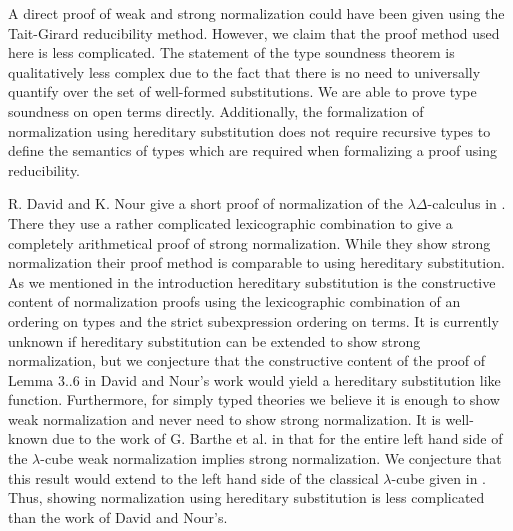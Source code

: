 A direct proof of weak and strong normalization could have been given
using the Tait-Girard reducibility method.  However, we claim that the
proof method used here is less complicated.  The statement of the type
soundness theorem is qualitatively less complex due to the fact that
there is no need to universally quantify over the set of well-formed
substitutions.  We are able to prove type soundness on open terms
directly.  Additionally, the formalization of normalization using
hereditary substitution does not require recursive types to define the
semantics of types which are required when formalizing a proof using
reducibility.  

R. David and K. Nour give a short proof of normalization of the
$\lambda\Delta$-calculus in \cite{David:2003}.  There they use a
rather complicated lexicographic combination to give a completely
arithmetical proof of strong normalization.  While they show strong
normalization their proof method is comparable to using hereditary
substitution.  As we mentioned in the introduction hereditary
substitution is the constructive content of normalization proofs using
the lexicographic combination of an ordering on types and the strict
subexpression ordering on terms.  It is currently unknown if
hereditary substitution can be extended to show strong normalization,
but we conjecture that the constructive content of the proof of Lemma
3..6 in David and Nour's work would yield a hereditary substitution
like function.  Furthermore, for simply typed theories we believe it
is enough to show weak normalization and never need to show strong
normalization.  It is well-known due to the work of G. Barthe et
al. in \cite{Barthe:2001} that for the entire left hand side of the
$\lambda$-cube weak normalization implies strong normalization.  We
conjecture that this result would extend to the left hand side of the
classical $\lambda$-cube given in \cite{Barthe:1997}.  Thus, showing
normalization using hereditary substitution is less complicated than
the work of David and Nour's.

